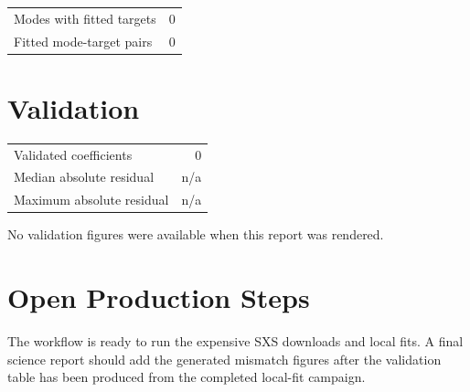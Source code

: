 \documentclass[11pt]{article}
\begin{document}
\begin{tabular}{lr}
\toprule
Modes with fitted targets & 0\\
Fitted mode-target pairs & 0\\
\bottomrule
\end{tabular}

\section{Validation}
\begin{tabular}{lr}
\toprule
Validated coefficients & 0\\
Median absolute residual & n/a\\
Maximum absolute residual & n/a\\
\bottomrule
\end{tabular}

No validation figures were available when this report was rendered.

\section{Open Production Steps}
The workflow is ready to run the expensive SXS downloads and local fits. A final
science report should add the generated mismatch figures after the validation
table has been produced from the completed local-fit campaign.
\end{document}
